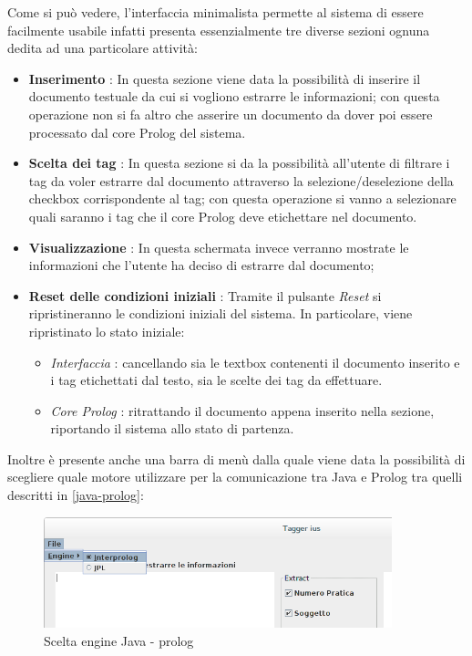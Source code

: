 Come si può vedere, l'interfaccia minimalista permette al sistema di essere facilmente usabile infatti presenta essenzialmente tre diverse sezioni ognuna dedita ad una particolare attività:
    \begin{itemize}
    	\item \textbf{Inserimento} : In questa sezione viene data la possibilità di inserire il documento testuale da cui si vogliono estrarre le informazioni; con questa operazione non si fa altro che asserire un documento da dover poi essere processato dal core Prolog del sistema.
    	\item \textbf{Scelta dei tag} : In questa sezione si da la possibilità all'utente di filtrare i tag da voler estrarre dal documento attraverso la selezione/deselezione della checkbox corrispondente al tag; con questa operazione si vanno a selezionare quali saranno i tag che il core Prolog deve etichettare nel documento.
    	\item \textbf{Visualizzazione} : In questa schermata invece verranno mostrate le informazioni che l'utente ha deciso di estrarre dal documento;
    	\item \textbf{Reset delle condizioni iniziali} : Tramite il pulsante \emph{Reset} si ripristineranno le condizioni iniziali del sistema. In particolare, viene ripristinato lo stato iniziale:
    	\begin{itemize}
    		\item \emph{Interfaccia} : cancellando sia le textbox contenenti il documento inserito e i tag etichettati dal testo, sia le scelte dei tag da effettuare.
    		\item \emph{Core Prolog} : ritrattando il documento appena inserito nella sezione, riportando il sistema allo stato di partenza.
    	\end{itemize}
    \end{itemize}
Inoltre è presente anche una barra di menù dalla quale viene data la possibilità di scegliere quale motore utilizzare per la comunicazione tra Java e Prolog tra quelli descritti in \ref{java-prolog}:
\begin{figure}[H]
	\centering
	\includegraphics[width=0.9\textwidth]{img/interfaces/java-engine.png}
	\caption[Schermata Java engine]{Scelta engine Java - prolog}
	\label{java-engine}
\end{figure}
\clearpage
